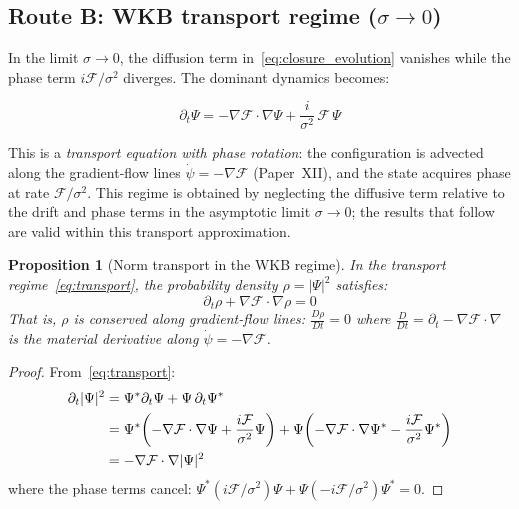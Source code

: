 \documentclass[12pt]{article}
\newtheorem{proposition}[theorem]{Proposition}
\newcommand{\Fcal}{\mathcal{F}}
\begin{document}
\subsection{Route B: WKB transport regime ($\sigma \to 0$)}\label{sec:routeB}

In the limit $\sigma \to 0$, the diffusion term in~\eqref{eq:closure_evolution} vanishes while the phase term $i\Fcal/\sigma^2$ diverges. The dominant dynamics becomes:

\begin{equation}\label{eq:transport}
    \partial_t \Psi = -\nabla\Fcal \cdot \nabla\Psi + \frac{i}{\sigma^2}\,\Fcal\,\Psi
\end{equation}

This is a \textit{transport equation with phase rotation}: the configuration is advected along the gradient-flow lines $\dot{\psi} = -\nabla\Fcal$ (Paper~XII), and the state acquires phase at rate $\Fcal/\sigma^2$. This regime is obtained by neglecting the diffusive term relative to the drift and phase terms in the asymptotic limit $\sigma \to 0$; the results that follow are valid within this transport approximation.

\begin{proposition}[Norm transport in the WKB regime]\label{prop:normtransport}
In the transport regime~\eqref{eq:transport}, the probability density $\rho = |\Psi|^2$ satisfies:
\begin{equation}\label{eq:rhotransport}
    \partial_t \rho + \nabla\Fcal \cdot \nabla\rho = 0
\end{equation}
That is, $\rho$ is conserved along gradient-flow lines: $\frac{D\rho}{Dt} = 0$ where $\frac{D}{Dt} = \partial_t - \nabla\Fcal \cdot \nabla$ is the material derivative along $\dot{\psi} = -\nabla\Fcal$.
\end{proposition}

\begin{proof}
From~\eqref{eq:transport}:
\begin{align}
    \partial_t|\Psi|^2 &= \Psi^*\partial_t\Psi + \Psi\,\partial_t\Psi^* \notag \\
    &= \Psi^*\!\left(-\nabla\Fcal\cdot\nabla\Psi + \frac{i\Fcal}{\sigma^2}\Psi\right) + \Psi\!\left(-\nabla\Fcal\cdot\nabla\Psi^* - \frac{i\Fcal}{\sigma^2}\Psi^*\right) \notag \\
    &= -\nabla\Fcal \cdot \nabla|\Psi|^2
\end{align}
where the phase terms cancel: $\Psi^*(i\Fcal/\sigma^2)\Psi + \Psi(-i\Fcal/\sigma^2)\Psi^* = 0$.
\end{proof}
\end{document}
